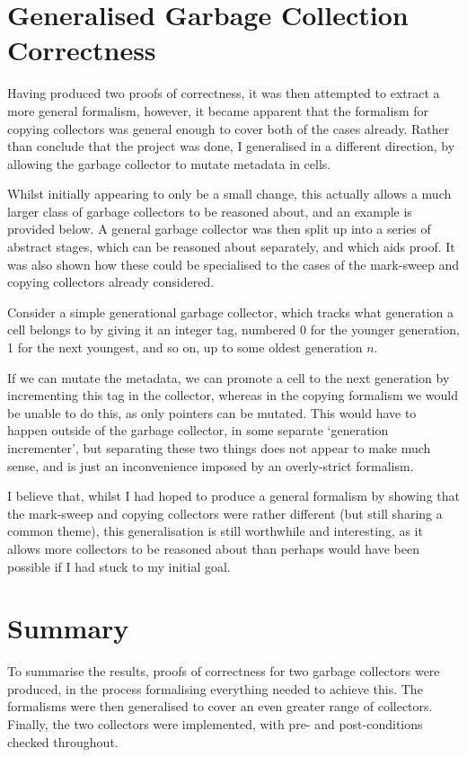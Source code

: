 \section{Generalised Garbage Collection Correctness}
\label{sec:results-correctness}

Having produced two proofs of correctness, it was then attempted to
extract a more general formalism, however, it became apparent that the
formalism for copying collectors was general enough to cover both of
the cases already. Rather than conclude that the project was done, I
generalised in a different direction, by allowing the garbage
collector to mutate metadata in cells.

Whilst initially appearing to only be a small change, this actually
allows a much larger class of garbage collectors to be reasoned about,
and an example is provided below. A general garbage collector was then
split up into a series of abstract stages, which can be reasoned about
separately, and which aids proof. It was also shown how these could be
specialised to the cases of the mark-sweep and copying collectors
already considered.

\begin{example}
  Consider a simple generational garbage collector, which tracks what
  generation a cell belongs to by giving it an integer tag, numbered 0
  for the younger generation, 1 for the next youngest, and so on, up
  to some oldest generation $n$.

  If we can mutate the metadata, we can promote a cell to the next
  generation by incrementing this tag in the collector, whereas in the
  copying formalism we would be unable to do this, as only pointers
  can be mutated. This would have to happen outside of the garbage
  collector, in some separate `generation incrementer', but
  separating these two things does not appear to make much sense, and
  is just an inconvenience imposed by an overly-strict formalism.
\end{example}

I believe that, whilst I had hoped to produce a general formalism by
showing that the mark-sweep and copying collectors were rather
different (but still sharing a common theme), this generalisation is
still worthwhile and interesting, as it allows more collectors to be
reasoned about than perhaps would have been possible if I had stuck to
my initial goal.

\section{Summary}
\label{sec:results-summary}

To summarise the results, proofs of correctness for two garbage
collectors were produced, in the process formalising everything needed
to achieve this. The formalisms were then generalised to cover an even
greater range of collectors. Finally, the two collectors were
implemented, with pre- and post-conditions checked throughout.
